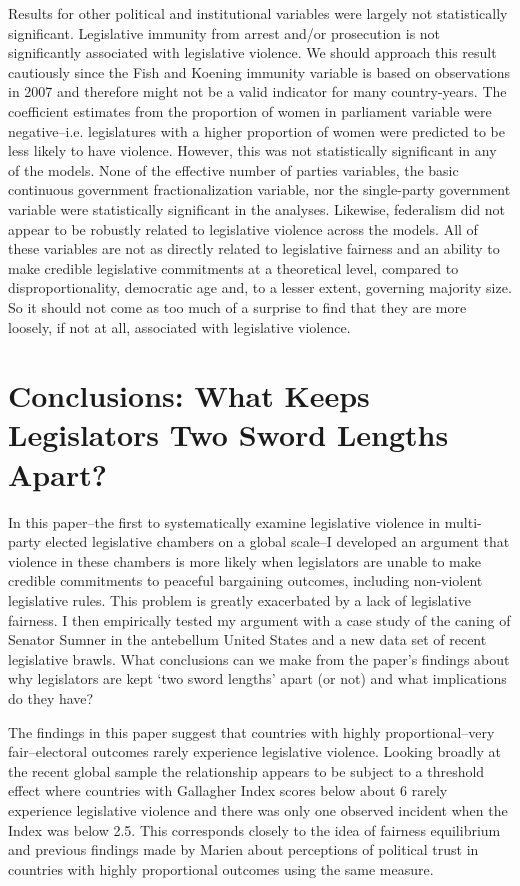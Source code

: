 \documentclass[a4paper]{article}\usepackage[]{graphicx}\usepackage[]{color}
\begin{document}
Results for other political and institutional variables were largely not statistically significant. Legislative immunity from arrest and/or prosecution is not significantly associated with legislative violence. We should approach this result cautiously since the Fish and Koening immunity variable is based on observations in 2007 and therefore might not be a valid indicator for many country-years. The coefficient estimates from the proportion of women in parliament variable were negative--i.e. legislatures with a higher proportion of women were predicted to be less likely to have violence. However, this was not statistically significant in any of the models. None of the effective number of parties variables, the basic continuous government fractionalization variable, nor the single-party government variable were statistically significant in the analyses. Likewise, federalism did not appear to be robustly related to legislative violence across the models. All of these variables are not as directly related to legislative fairness and an ability to make credible legislative commitments at a theoretical level, compared to disproportionality, democratic age and, to a lesser extent, governing majority size. So it should not come as too much of a surprise to find that they are more loosely, if not at all, associated with legislative violence.

\section*{Conclusions: What Keeps Legislators Two Sword Lengths Apart?}

In this paper--the first to systematically examine legislative violence in multi-party elected legislative chambers on a global scale--I developed an argument that violence in these chambers is more likely when legislators are unable to make credible commitments to peaceful bargaining outcomes, including non-violent legislative rules. This problem is greatly exacerbated by a lack of legislative fairness. I then empirically tested my argument with a case study of the caning of Senator Sumner in the antebellum United States and a new data set of recent legislative brawls. What conclusions can we make from the paper's findings about why legislators are kept `two sword lengths' apart (or not) and what implications do they have?

The findings in this paper suggest that countries with highly proportional--very fair--electoral outcomes rarely experience legislative violence. Looking broadly at the recent global sample the relationship appears to be subject to a threshold effect where countries with Gallagher Index scores below about 6 rarely experience legislative violence and there was only one observed incident when the Index was below 2.5. This corresponds closely to the idea of fairness equilibrium and previous findings made by Marien \citeyearpar{Marien2011} about perceptions of political trust in countries with highly proportional outcomes using the same measure.
\end{document}
